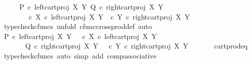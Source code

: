 \begin{isabellebody}
\ \ \isamarkupfalse%
\ \isamarkupfalse%
\ {\isachardoublequoteopen}{\isasymlangle}P\ {\isasymcirc}\isactrlsub c\ left{\isacharunderscore}{\kern0pt}cart{\isacharunderscore}{\kern0pt}proj\ X\ Y{\isacharcomma}{\kern0pt}\ Q\ {\isasymcirc}\isactrlsub c\ right{\isacharunderscore}{\kern0pt}cart{\isacharunderscore}{\kern0pt}proj\ X\ Y{\isasymrangle}\isanewline
\ \ \ \ \ \ {\isacharequal}{\kern0pt}\ {\isasymlangle}{\isasymf}\ {\isasymcirc}\isactrlsub c\ {\isasymbeta}\isactrlbsub X\isactrlesub \ {\isasymcirc}\isactrlsub c\ left{\isacharunderscore}{\kern0pt}cart{\isacharunderscore}{\kern0pt}proj\ X\ Y{\isacharcomma}{\kern0pt}\ {\isasymf}\ {\isasymcirc}\isactrlsub c\ {\isasymbeta}\isactrlbsub Y\isactrlesub \ {\isasymcirc}\isactrlsub c\ right{\isacharunderscore}{\kern0pt}cart{\isacharunderscore}{\kern0pt}proj\ X\ Y{\isasymrangle}{\isachardoublequoteclose}\isanewline
\ \ \ \ \isamarkupfalse%
\ {\isacharparenleft}{\kern0pt}typecheck{\isacharunderscore}{\kern0pt}cfuncs{\isacharcomma}{\kern0pt}\ unfold\ cfunc{\isacharunderscore}{\kern0pt}cross{\isacharunderscore}{\kern0pt}prod{\isacharunderscore}{\kern0pt}def{}{\isacharcomma}{\kern0pt}\ auto{\isacharparenright}{\kern0pt}\isanewline
\ \ \isamarkupfalse%
\ \isamarkupfalse%
\ {\isachardoublequoteopen}P\ {\isasymcirc}\isactrlsub c\ left{\isacharunderscore}{\kern0pt}cart{\isacharunderscore}{\kern0pt}proj\ X\ Y\ {\isacharequal}{\kern0pt}\ {\isacharparenleft}{\kern0pt}{\isasymf}\ {\isasymcirc}\isactrlsub c\ {\isasymbeta}\isactrlbsub X\isactrlesub {\isacharparenright}{\kern0pt}\ {\isasymcirc}\isactrlsub c\ left{\isacharunderscore}{\kern0pt}cart{\isacharunderscore}{\kern0pt}proj\ X\ Y\isanewline
\ \ \ \ \ \ {\isasymand}\ Q\ {\isasymcirc}\isactrlsub c\ right{\isacharunderscore}{\kern0pt}cart{\isacharunderscore}{\kern0pt}proj\ X\ Y\ {\isacharequal}{\kern0pt}\ {\isacharparenleft}{\kern0pt}{\isasymf}\ {\isasymcirc}\isactrlsub c\ {\isasymbeta}\isactrlbsub Y\isactrlesub {\isacharparenright}{\kern0pt}\ {\isasymcirc}\isactrlsub c\ right{\isacharunderscore}{\kern0pt}cart{\isacharunderscore}{\kern0pt}proj\ X\ Y{\isachardoublequoteclose}\isanewline
\ \ \ \ \isamarkupfalse%
\ \ cart{\isacharunderscore}{\kern0pt}prod{\isacharunderscore}{\kern0pt}eq{}\ \isamarkupfalse%
\ {\isacharparenleft}{\kern0pt}typecheck{\isacharunderscore}{\kern0pt}cfuncs{\isacharcomma}{\kern0pt}\ auto\ simp\ add{\isacharcolon}{\kern0pt}\ comp{\isacharunderscore}{\kern0pt}associative{}{\isacharparenright}{\kern0pt}\isanewline

\end{isabellebody}
